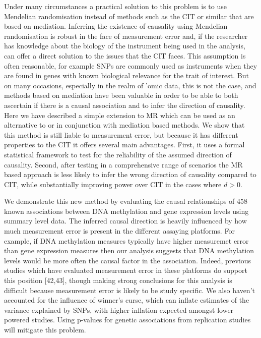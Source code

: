 \documentclass[]{article}
\begin{document}
Under many circumstances a practical solution to this problem is to use
Mendelian randomisation instead of methods such as the CIT or similar
that are based on mediation. Inferring the existence of causality using
Mendelian randomisation is robust in the face of measurement error and,
if the researcher has knowledge about the biology of the instrument
being used in the analysis, can offer a direct solution to the issues
that the CIT faces. This assumption is often reasonable, for example
SNPs are commonly used as instruments when they are found in genes with
known biological relevance for the trait of interest. But on many
occasions, especially in the realm of 'omic data, this is not the case,
and methods based on mediation have been valuable in order to be able to
both ascertain if there is a causal association and to infer the
direction of causality. Here we have described a simple extension to MR
which can be used as an alternative to or in conjunction with mediation
based methods. We show that this method is still liable to measurement
error, but because it has different properties to the CIT it offers
several main advantages. First, it uses a formal statistical framework
to test for the reliability of the assumed direction of causality.
Second, after testing in a comprehensive range of scenarios the MR based
approach is less likely to infer the wrong direction of causality
compared to CIT, while substantially improving power over CIT in the
cases where \(d > 0\).

We demonstrate this new method by evaluating the causal relationships of
458 known associations between DNA methylation and gene expression
levels using summary level data. The inferred causal direction is
heavily influenced by how much measurement error is present in the
different assaying platforms. For example, if DNA methylation measures
typically have higher measuremet error than gene expression measures
then our analysis suggests that DNA methylation levels would be more
often the causal factor in the association. Indeed, previous studies
which have evaluated measurement error in these platforms do support
this position {[}42,43{]}, though making strong conclusions for this
analysis is difficult because measurement error is likely to be study
specific. We also haven't accounted for the influence of winner's curse,
which can inflate estimates of the variance explained by SNPs, with
higher inflation expected amongst lower powered studies. Using p-values
for genetic associations from replication studies will mitigate this
problem.
\end{document}
